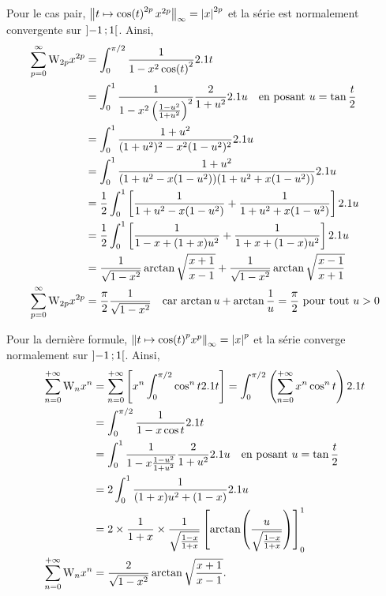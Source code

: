 \begin{solution}
\begin{reponses}
\item Pour le cas pair, $\big\Vert t \mapsto \cos(t)^{2p} \, x^{2p} \big\Vert_{\infty} = \abs{x}^{2p}$ et la série est normalement convergente sur $\left]-1\,;1\right[$. Ainsi,
\begin{align*}
\sum_{p=0}^\infty \mathrm{W}_{2p} x^{2p} &= \int_0^{\pi/2} \frac{1}{1 - x^2 \cos(t)^2} 2.1 t \\
&= \int_0^1 \frac{1}{1 - x^2 \left(\frac{1-u^2}{1+u^2}\right)^2} \frac{2}{1 + u^2} 2.1 u \quad \text{en posant } u = \tan \frac{t}{2} \\
&= \int_0^1 \frac{1 + u^2}{(1 + u^2)^2 - x^2(1-u^2)^2} 2.1 u \\
&= \int_0^1 \frac{1 + u^2}{(1 + u^2 - x(1-u^2))(1 + u^2 + x(1-u^2))} 2.1 u \\
&= \frac{1}{2} \int_0^1 \left[ \frac{1}{1 + u^2 - x(1-u^2)} + \frac{1}{1 + u^2 + x(1-u^2)}\right] 2.1 u \\
&= \frac{1}{2} \int_0^1 \left[\frac{1}{1 - x + (1+x)u^2} + \frac{1}{1 + x + (1-x)u^2} \right] 2.1 u \\
&= \frac{1}{\sqrt{1-x^2}} \arctan \sqrt{\frac{x+1}{x-1}} + \frac{1}{\sqrt{1-x^2}} \arctan \sqrt{\frac{x-1}{x+1}}\\
\sum_{p=0}^\infty \mathrm{W}_{2p} x^{2p} &= \frac{\pi}{2} \frac{1}{\sqrt{1-x^2}} \quad \text{car $\arctan u + \arctan \frac{1}{u} = \frac{\pi}{2}$ pour tout $u > 0$}
\end{align*}

\item Pour la dernière formule, $\norm{t \mapsto \cos(t)^p x^p}_{\infty} = \mathopen{}\left| x \right|^p$ et la série converge normalement sur $\left]-1\,;1\right[$. Ainsi,
\begin{align*}
\sum_{n=0}^{+ \infty} \mathrm{W}_n x^n &= \sum_{n=0}^{+ \infty} \left[ x^n \int_0^{\pi/2} \cos^n t 2.1 t \right] = \int_0^{\pi/2} \left( \sum_{n=0}^{+\infty} x^n \cos^n t \right) 2.1 t \\
&=\int_0^{\pi/2} \frac{1}{1 - x \cos t} 2.1 t \\
&= \int_0^1 \frac{1}{1 - x \frac{1-u^2}{1+u^2}} \frac{2}{1 + u^2} 2.1 u \quad \text{en posant } u = \tan \frac{t}{2} \\
&= 2 \int_0^1 \frac{1}{(1+x)u^2 + (1-x)} 2.1 u \\
&= 2 \times \frac{1}{1+x} \times \frac{1}{\sqrt{\frac{1-x}{1+x}}} \left[ \arctan\mathopen{}\left( \frac{u}{\sqrt{\frac{1-x}{1+x}}} \right) \right]_0^1 \\
\sum_{n=0}^{+ \infty} \mathrm{W}_n x^n &= \frac{2}{\sqrt{1-x^2}} \arctan \sqrt{\frac{x+1}{x-1}}.
\end{align*}
\end{reponses}
\end{solution}

